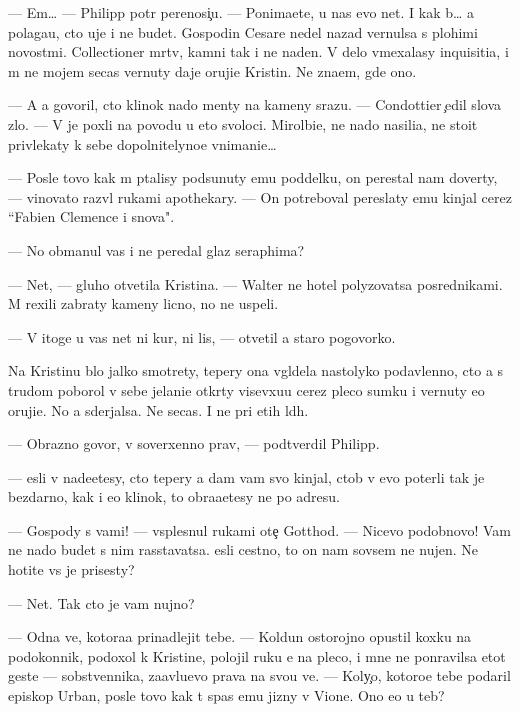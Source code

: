 \documentclass[10pt]{book}
\begin{document}
— Em… — Philipp pot{\e}r perenosi{\c}u. — Ponima{\y}ete, u nas {\y}evo net. I kak b{\yi}… {\y}a polaga{\y}u, cto uje i ne budet. Gospodin Cesare nedel{\io} nazad vernulsa s plohimi novost{\ia}mi. Collectioner m{\e}rtv, kamni tak i ne na{\y}den{\yi}. V delo vmexalasy inquisiti{\y}a, i m{\yi} ne mojem se{\y}cas vernuty daje oruji{\y}e Kristin{\yi}. Ne zna{\y}em, gde ono.

— A {\y}a govoril, cto klinok nado men{\ia}ty na kameny srazu. — Condottier {\c}edil slova zlo. — V{\yi} je poxli na povodu u eto{\y} svoloci. Mirol{\io}bi{\y}e, ne nado nasili{\y}a, ne stoit privlekaty k sebe dopolnitelyno{\y}e vnimani{\y}e…

— Posle tovo kak m{\yi} p{\yi}talisy podsunuty {\y}emu poddelku, on perestal nam dover{\ia}ty, — vinovato razv{\e}l rukami apothekary. — On potreboval pereslaty {\y}emu kinjal cerez ``Fabien Clemence i s{\yi}nov{\y}a".

— No obmanul vas i ne peredal glaz seraphima?

— Net, — gluho otvetila Kristina. — Walter ne hotel polyzovatsa posrednikami. M{\yi} rexili zabraty kameny licno, no ne uspeli.

— V itoge u vas net ni kur, ni lis{\yi}, — otvetil {\y}a staro{\y} pogovorko{\y}.

Na Kristinu b{\yi}lo jalko smotrety, tepery ona v{\yi}gl{\ia}dela nastolyko podavlenno{\y}, cto {\y}a s trudom poborol v sebe jelani{\y}e otkr{\yi}ty visevxu{\y}u cerez pleco sumku i vernuty {\y}e{\y}o oruji{\y}e. No {\y}a sderjalsa. Ne se{\y}cas. I ne pri etih l{\io}d{\ia}h.

— Obrazno govor{\ia}, v{\yi} soverxenno prav{\yi}, — podtverdil Philipp.

— {\Y}esli v{\yi} nade{\y}etesy, cto tepery {\y}a dam vam svo{\y} kinjal, ctob{\yi} v{\yi} {\y}evo poter{\ia}li tak je bezdarno, kak i {\y}e{\y}o klinok, to obra{\x}a{\y}etesy ne po adresu.

— Gospody s vami! — vsplesnul rukami ote{\c} Gotthod. — Nicevo podobnovo! Vam ne nado budet s nim rasstavatsa. {\Y}esli cestno, to on nam sovsem ne nujen. Ne hotite vs{\e} je prisesty?

— Net. Tak cto je vam nujno?

— Odna ve{\x}, kotora{\y}a prinadlejit tebe. — Koldun ostorojno opustil koxku na podokonnik, podoxol k Kristine, polojil ruku {\y}e{\y} na pleco, i mne ne ponravilsa etot geste — sobstvennika, za{\y}avl{\ia}{\y}u{\x}evo prava na svo{\y}u ve{\x}. — Koly{\c}o, kotoro{\y}e tebe podaril episkop Urban, posle tovo kak t{\yi} spas {\y}emu jizny v Vione. Ono {\y}e{\x}o u teb{\ia}?
\end{document}

